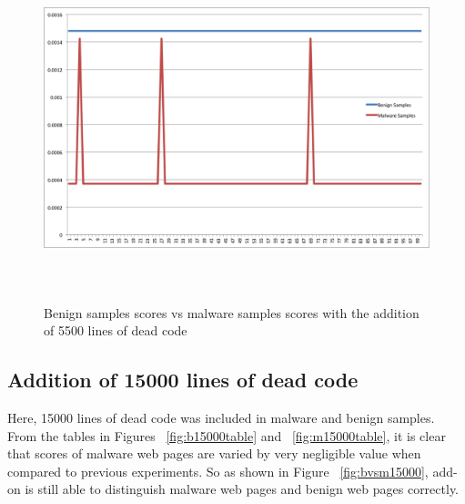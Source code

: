 \begin{figure}[h]
    \centering    
    \includegraphics[width=16cm, height=10cm]{5000.png}
    \caption[Benign Samples vs Malware Samples]{Benign samples scores vs malware samples scores with the addition of 5500 lines of dead code}
    \label{fig:bvsm5500}
\end{figure}

\subsection{Addition of 15000 lines of dead code}
Here, 15000 lines of dead code was included in malware and benign samples. From the tables in Figures ~\ref{fig:b15000table} and  ~\ref{fig:m15000table}, it is clear that scores of malware web pages are varied by very negligible value when compared to previous experiments. So as shown in Figure ~\ref{fig:bvsm15000}, add-on is still able to distinguish malware web pages and benign web pages correctly.

